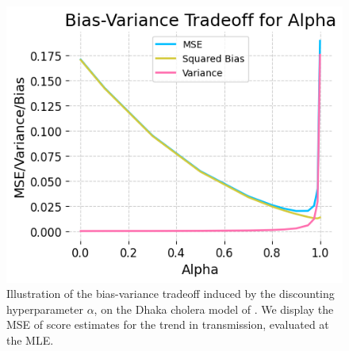 \documentclass[9pt,twocolumn,pnasresearcharticle]{pnas-new}
\newcommand\arxiv[2]{#2} %
\begin{document}
\begin{figure}[htbp!]
  \centering
    \includegraphics[width=\arxiv{10cm}{\textwidth/3}]{imgs/095/biasvar.png}
    \caption{Illustration of the bias-variance tradeoff induced by the discounting hyperparameter $\alpha$, on the Dhaka cholera model of \cite{king08}. We display the MSE of score estimates for the trend in transmission, evaluated at the MLE.}
    \label{fig:biasvar}
    \arxiv{}{\vspace*{-1ex}}
\end{figure}


\end{document}
